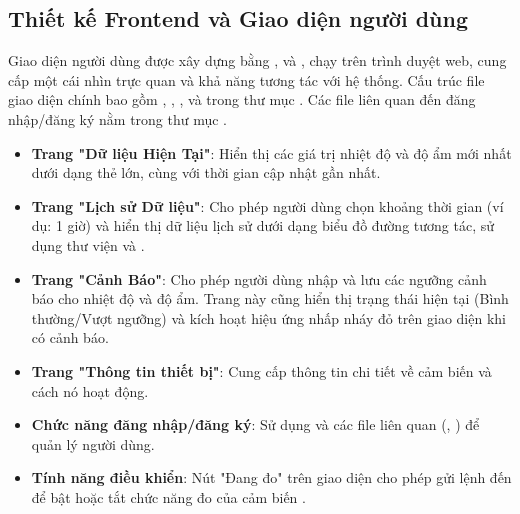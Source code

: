 \subsection{Thiết kế Frontend và Giao diện người dùng}
Giao diện người dùng được xây dựng bằng ,  và , chạy trên trình duyệt web, cung cấp một cái nhìn trực quan và khả năng tương tác với hệ thống. Cấu trúc file giao diện chính bao gồm , , , và  trong thư mục . Các file liên quan đến đăng nhập/đăng ký nằm trong thư mục .

\begin{itemize}
	\item \textbf{Trang "Dữ liệu Hiện Tại"}: Hiển thị các giá trị nhiệt độ và độ ẩm mới nhất dưới dạng thẻ lớn, cùng với thời gian cập nhật gần nhất.
	\item \textbf{Trang "Lịch sử Dữ liệu"}: Cho phép người dùng chọn khoảng thời gian (ví dụ: 1 giờ) và hiển thị dữ liệu lịch sử dưới dạng biểu đồ đường tương tác, sử dụng thư viện  và .
	\item \textbf{Trang "Cảnh Báo"}: Cho phép người dùng nhập và lưu các ngưỡng cảnh báo cho nhiệt độ và độ ẩm. Trang này cũng hiển thị trạng thái hiện tại (Bình thường/Vượt ngưỡng) và kích hoạt hiệu ứng nhấp nháy đỏ trên giao diện khi có cảnh báo.
	\item \textbf{Trang "Thông tin thiết bị"}: Cung cấp thông tin chi tiết về cảm biến  và cách nó hoạt động.
	\item \textbf{Chức năng đăng nhập/đăng ký}: Sử dụng  và các file  liên quan (, ) để quản lý người dùng.
	\item \textbf{Tính năng điều khiển}: Nút "Đang đo" trên giao diện cho phép gửi lệnh đến   để bật hoặc tắt chức năng đo của cảm biến .
\end{itemize}

